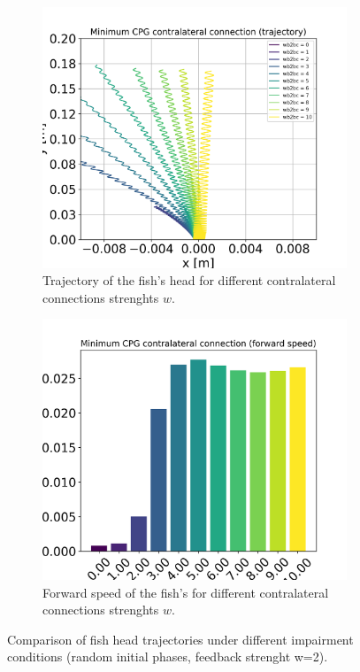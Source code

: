 \documentclass{cmc}
\begin{document}
\begin{figure}[H]
    \centering
    \begin{subfigure}[t]{0.48\linewidth}
        \centering
        \includegraphics[width=\linewidth]{our_figures/min_contralateral_connections_trajectory.png}
        \caption{Trajectory of the fish's head for different contralateral connections strenghts $w$.}
        \label{fig:contra_strenght_traj}
    \end{subfigure}
    \hfill
    \begin{subfigure}[t]{0.48\linewidth}
        \centering
        \includegraphics[width=\linewidth]{our_figures/min_contralateral_connections_speed.png}
        \caption{Forward speed of the fish's for different contralateral connections strenghts $w$.}
        \label{fig:contra_strenght_speed}
    \end{subfigure}
    \caption{Comparison of fish head trajectories under different impairment conditions (random initial phases, feedback strenght w=2).}
    
\end{figure}
\end{document}
